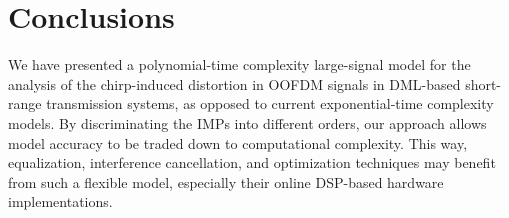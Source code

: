 \documentclass[journal]{IEEEtran}
\begin{document}
\section{Conclusions} \label{sec:conclusion}

We have presented a polynomial-time complexity large-signal model for the analysis of the chirp-induced distortion in OOFDM signals in DML-based short-range transmission systems, as opposed to current exponential-time complexity models. By discriminating the IMPs into different orders, our approach allows model accuracy to be traded down to computational complexity. This way, equalization, interference cancellation, and optimization techniques may benefit from such a flexible model, especially their online DSP-based hardware implementations. 


\end{document}
